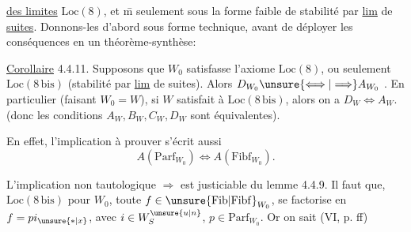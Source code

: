 
\uline{des limites} $\mathrm{Loc}(8)$, et \={m} seulement sous la forme faible de stabilité   par \uline{lim} de \uline{suites}. Donnons-les d'abord sous forme technique, avant de déployer les conséquences en un théorème-synthèse:

\uline{Corollaire} 4.4.11. Supposons que $W_0$ satisfasse  l'axiome $\mathrm{Loc}(8)$, ou seulement $\mathrm{Loc}(8\,\mathrm{bis})$ (stabilité par \uline{lim} de suites). Alors $D_{W_0}\unsure{\Longleftrightarrow|\Longrightarrow}A_{W_0}$ . En particulier (faisant $W_0=W$), si $W$ satisfait à $\mathrm{Loc}(8\,\mathrm{bis})$, alors on a $D_W\Longleftrightarrow A_W$. (donc les conditions $A_W,B_W,C_W,D_W$ sont équivalentes).

En effet, l'implication à prouver s'écrit aussi
\[
 A(\mathrm{Parf}_{W_0})\Longleftrightarrow A(\mathrm{Fibf}_{W_0}).
\]

L'implication  non tautologique $\Longrightarrow$ est justiciable du lemme 4.4.9. Il faut   que,  $\mathrm{Loc}(8\,\mathrm{bis})$ pour $W_0$, toute $f\in\unsure{\mathrm{Fib}|\mathrm{Fibf}}_{W_0}$,  se factorise en $f=pi_{\unsure{*|x}}$, avec $i\in W_S^{\unsure{u|n}}$, $p\in\mathrm{Parf}_{W_0}$. Or on sait (VI, p.  ff)

